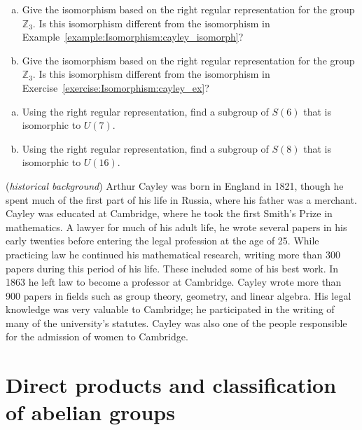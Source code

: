 \begin{exercise}{}
\begin{enumerate}[(a)]
\item
Give the isomorphism  based on the right regular representation for the group $\mathbb{Z}_3$.  Is this isomorphism different from the isomorphism in Example~\ref{example:Isomorphism:cayley_isomorph}?
\item
Give the isomorphism  based on the right regular representation for the group $\mathbb{Z}_3$.  Is this isomorphism different from the isomorphism in Exercise~\ref{exercise:Isomorphism:cayley_ex}?
\end{enumerate}
\end{exercise}


\begin{exercise}{}
\begin{enumerate}[(a)]
\item
Using the right regular representation, find a subgroup of $S(6)$ that is isomorphic to $U(7)$.
\item
Using the right regular representation, find a subgroup of $S(8)$ that is isomorphic to $U(16)$.
\end{enumerate}
\end{exercise}

\begin{rem} (\emph{historical background})  Arthur Cayley was born in England in 1821, though he spent much of the first part of his life in Russia, where his father was a merchant.  Cayley was educated at Cambridge, where he took the first Smith's Prize in mathematics.  A lawyer for much of his adult life, he wrote several papers in his early twenties before entering the legal profession at the age of 25.  While practicing law he continued his mathematical research, writing more than 300 papers during this period of his life.  These included some of his best work.  In 1863 he left law to become a professor at Cambridge.  Cayley wrote more than 900 papers in fields such as group theory, geometry, and linear algebra. His legal knowledge was very valuable to Cambridge; he participated in the writing of many of the university's statutes.  Cayley was also one of the people responsible for the admission of women to Cambridge. 
\end{rem} 

\section{Direct products and classification of abelian groups\quad
{}}
\label{sec:Isomorphism:DirectProductsClassificationAbelianGroups}

